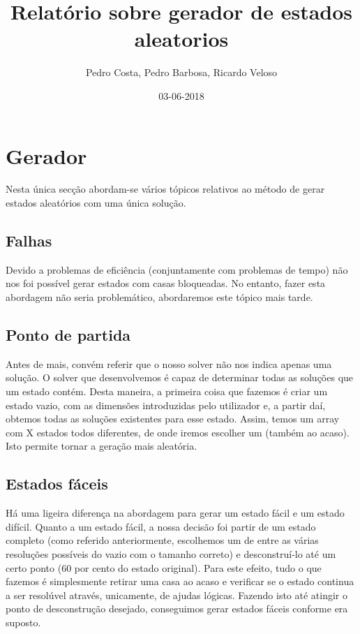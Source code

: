 \documentclass{article}
\title{Relatório sobre gerador de estados aleatorios}
\date{03-06-2018}
\author{Pedro Costa, Pedro Barbosa, Ricardo Veloso}
\begin{document}
  \maketitle
  \newpage

\section{Gerador}

Nesta única secção abordam-se vários tópicos relativos ao método de gerar estados aleatórios com uma única solução.

\subsection{Falhas}

Devido a problemas de eficiência (conjuntamente com problemas de tempo) não nos foi possível gerar estados com casas bloqueadas.
No entanto, fazer esta abordagem não seria problemático, abordaremos este tópico mais tarde.

\subsection{Ponto de partida}

Antes de mais, convém referir que o nosso solver não nos indica apenas uma solução. O solver que desenvolvemos é capaz de determinar
todas as soluções que um estado contém. Desta maneira, a primeira coisa que fazemos é criar um estado vazio, com as dimensões introduzidas
pelo utilizador e, a partir daí, obtemos todas as soluções existentes para esse estado. Assim, temos um array com X estados todos diferentes, 
de onde iremos escolher um (também ao acaso). Isto permite tornar a geração mais aleatória. 

\subsection{Estados fáceis}

Há uma ligeira diferença na abordagem para gerar um estado fácil e um estado difícil. 
Quanto a um estado fácil, a nossa decisão foi partir de um estado completo (como referido anteriormente, escolhemos um de entre as várias 
resoluções possíveis do vazio com o tamanho correto) e desconstruí-lo até um certo ponto (60 por cento do estado original). Para este efeito, 
tudo o que fazemos é simplesmente retirar uma casa ao acaso e verificar se o estado continua a ser resolúvel através, unicamente, de ajudas lógicas.
Fazendo isto até atingir o ponto de desconstrução desejado, conseguimos gerar estados fáceis conforme era suposto.
\end{document}
